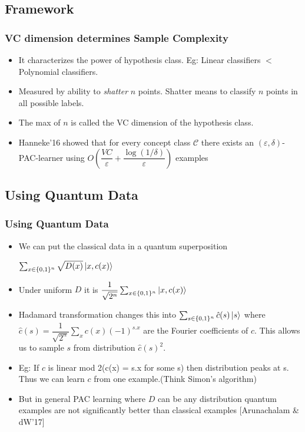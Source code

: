 \documentclass{beamer}
\begin{document}
\subsection{Framework}
\begin{frame}\frametitle{VC dimension determines Sample Complexity}

\begin{itemize}
  \item  It characterizes the power of hypothesis class. Eg: Linear classifiers $<$ Polynomial classifiers.
  \item Measured by ability to \textit{shatter} $n$ points. Shatter means to classify
  $n$ points in all possible labels.
  \item The max of $n$ is called the VC dimension of the hypothesis class.
  \item Hanneke'16 showed that for every concept class $\mathcal{C}$
  there exists an $(\varepsilon, \delta)$-PAC-learner using $O(\dfrac{VC}{\varepsilon} + \dfrac{\log(1/\delta)}{\varepsilon})$ examples
\end{itemize} 

\end{frame}



\subsection{Using Quantum Data}
\begin{frame}\frametitle{Using Quantum Data}
\begin{itemize}
    \item We can put the classical data in a quantum 
    superposition 

    $  \sum_{x \in \{0,1\}^{n} } \sqrt{D(x)} \ket{x, c(x)} $

    \item Under uniform $D$ it is $ \dfrac{1}{\sqrt{2^{n}}} \sum_{x \in \{0,1\}^{n} }  \ket{x, c(x)} $

    \item Hadamard transformation changes this into $  \sum_{s \in \{0,1\}^{n} } \hat{c}(s) \ket{s} $
    where $\hat{c}(s) = \dfrac{1}{\sqrt{2^{n}}} \sum_{x} c(x) (-1)^{s.x}$ are the Fourier coefficients of
    $c$. This allows us to sample $s$  from distribution $\hat{c}(s)^{2}$.

    \item Eg: If $c$ is linear mod 2(c(x) = s.x for some s)
    then distribution peaks at s. Thus we can learn $c$ from one example.(Think Simon's algorithm)
    \item But in general PAC learning where $D$ can be any distribution
    quantum examples are not significantly better than classical examples [Arunachalam \& dW’17]
    
\end{itemize}

\end{frame}
\end{document}
